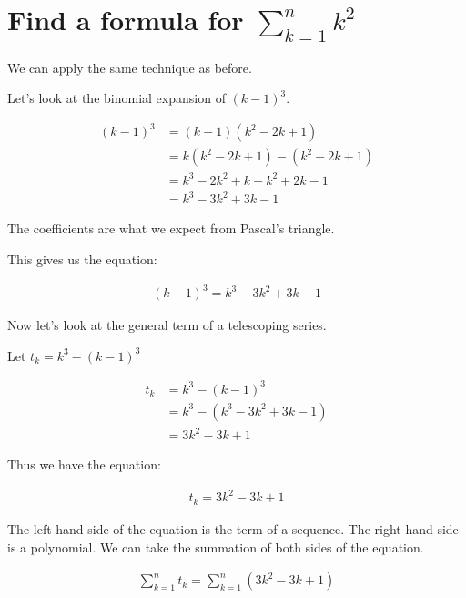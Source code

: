 \documentclass{article}
\begin{document}
\section{Find a formula for $\sum_{k=1}^{n} k^2$}
\begin{flushleft}
We can apply the same technique as before.
\end{flushleft}
\begin{flushleft}
Let's look at the binomial expansion of $(k-1)^3$.
\end{flushleft}
\begin{align*}
(k-1)^3 &= (k-1)(k^2 - 2k + 1) \\
&= k(k^2 - 2k + 1) - (k^2 - 2k + 1) \\
&= k^3 - 2k^2 + k - k^2 + 2k - 1 \\
&= k^3 - 3k^2 + 3k - 1
\end{align*}
\begin{flushleft}
The coefficients are what we expect from Pascal's triangle.
\end{flushleft}
\begin{flushleft}
This gives us the equation: 
\end{flushleft}
\begin{align}
(k-1)^3 = k^3 - 3k^2 + 3k - 1
\end{align}
\begin{flushleft}
Now let's look at the general term of a telescoping series.
\end{flushleft}
\begin{flushleft}
Let $t_{k} = k^3 - (k-1)^3$
\end{flushleft}
\begin{align*}
t_{k} &= k^3 - (k-1)^3 \\
&= k^3 - (k^3 - 3k^2 + 3k - 1) \\
&= 3k^2 - 3k + 1
\end{align*}
\begin{flushleft}
Thus we have the equation:
\end{flushleft}
\begin{align}
t_{k} = 3k^2 - 3k + 1
\end{align}
\begin{flushleft}
The left hand side of the equation is the term of a sequence. The right hand side is a polynomial. We can take the summation of both sides of the equation.
\end{flushleft}
\begin{align}
\sum_{k=1}^{n} t_{k} = \sum_{k=1}^{n} (3k^2 - 3k + 1)
\end{align}
\end{document}
